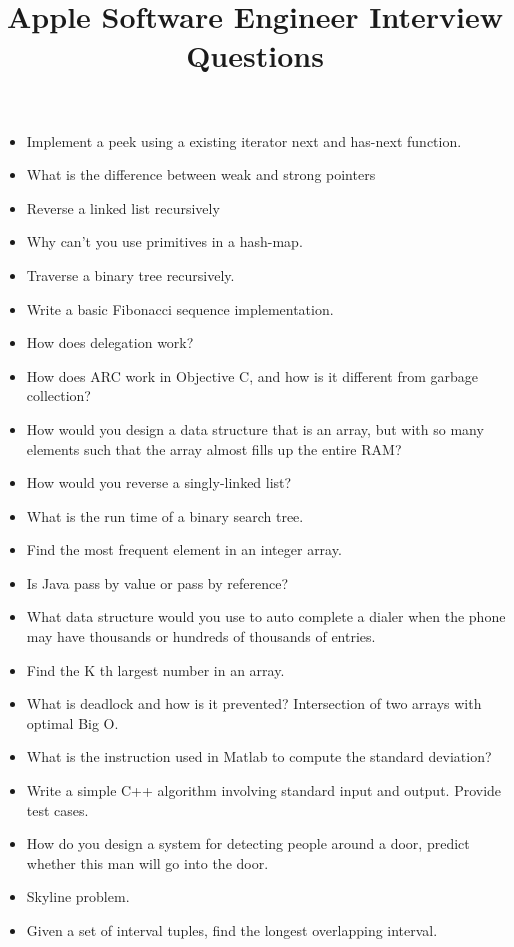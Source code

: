 \documentclass{article}
\begin{document}
\title{Apple Software Engineer Interview Questions}
\maketitle
\begin{itemize}
	\item Implement a peek using a existing iterator next and has-next function.
	\item What is the difference between weak and strong pointers
	\item Reverse a linked list recursively
	\item Why can't you use primitives in a hash-map.
	\item Traverse a binary tree recursively.
	\item Write a basic Fibonacci sequence implementation. 
	\item How does delegation work?
	\item How does ARC work in Objective C, and how is it different from garbage collection?
	\item How would you design a data structure that is an array, but with so many elements such that the array almost fills up the entire RAM?
	\item How would you reverse a singly-linked list?
	\item What is the run time of a binary search tree.
	\item Find the most frequent element in an integer array.
	\item Is Java pass by value or pass by reference?
	\item What data structure would you use to auto complete a dialer when the phone may have thousands or hundreds of thousands of entries.
	\item Find the K th largest number in an array.
	\item What is deadlock and how is it prevented? Intersection of two arrays with optimal Big O.
	\item What is the instruction used in Matlab to compute the standard deviation?
	\item Write a simple C++ algorithm involving standard input and output. Provide test cases.
	\item How do you design a system for detecting people around a door, predict whether this man will go into the door.
	\item Skyline problem.
	\item Given a set of interval tuples, find the longest overlapping interval.

\end{itemize}
\end{document}
